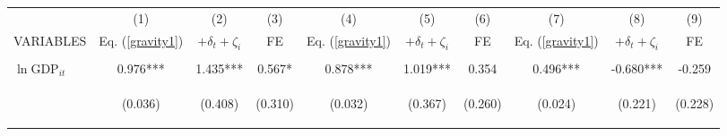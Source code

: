 \begin{center}
\begin{tabular}{lccccccccc} \hline
 & (1) & (2) & (3) & (4) & (5) & (6) & (7) & (8) & (9) \\
VARIABLES & Eq. (\ref{gravity1}) & $+\delta_t+\zeta_i$ & FE & Eq. (\ref{gravity1}) & $+\delta_t+\zeta_i$ & FE & Eq. (\ref{gravity1}) & $+\delta_t+\zeta_i$ & FE \\ \hline
\vspace{4pt} & \begin{footnotesize}\end{footnotesize} & \begin{footnotesize}\end{footnotesize} & \begin{footnotesize}\end{footnotesize} & \begin{footnotesize}\end{footnotesize} & \begin{footnotesize}\end{footnotesize} & \begin{footnotesize}\end{footnotesize} & \begin{footnotesize}\end{footnotesize} & \begin{footnotesize}\end{footnotesize} & \begin{footnotesize}\end{footnotesize} \\
$\ln\text{GDP}_{it}$ & 0.976*** & 1.435*** & 0.567* & 0.878*** & 1.019*** & 0.354 & 0.496*** & -0.680*** & -0.259 \\
\vspace{4pt} & \begin{footnotesize}(0.036)\end{footnotesize} & \begin{footnotesize}(0.408)\end{footnotesize} & \begin{footnotesize}(0.310)\end{footnotesize} & \begin{footnotesize}(0.032)\end{footnotesize} & \begin{footnotesize}(0.367)\end{footnotesize} & \begin{footnotesize}(0.260)\end{footnotesize} & \begin{footnotesize}(0.024)\end{footnotesize} & \begin{footnotesize}(0.221)\end{footnotesize} & \begin{footnotesize}(0.228)\end{footnotesize} \\

\end{tabular}
\end{center}
